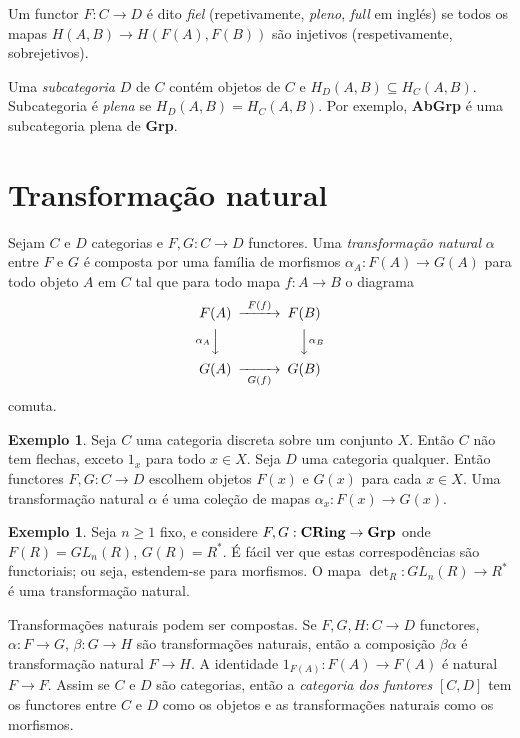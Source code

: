 \documentclass[12pt]{amsart}
\theoremstyle{definition}
\newtheorem{example}[theorem]{Exemplo}
\begin{document}
Um functor $F:C\to D$ é dito \emph{fiel} (repetivamente, \emph{pleno}, \emph{full} em inglés) se todos os mapas $H(A,B)\to H(F(A),F(B))$ são injetivos (respetivamente, sobrejetivos). 

Uma \emph{subcategoria} $D$ de $C$ contém objetos de $C$ e $H_D(A,B)\subseteq H_C(A,B)$. Subcategoria é 
\emph{plena}  se 
$H_D(A,B)= H_C(A,B)$. Por exemplo, {\bf AbGrp} é uma subcategoria plena de {\bf Grp}.

\section{Transformação natural}

Sejam $C$ e $D$ categorias e $F,G: C\to D$ functores. Uma \emph{transformação natural} $\alpha$ entre $F$ e $G$ é composta por uma família de morfismos 
$\alpha_A:F(A)\to G(A)$ para todo objeto $A$ em $C$ tal que para todo mapa $f:A \to B$ o diagrama 
\begin{equation}\label{eq:natural}
\begin{CD}
F(A) @>F(f)>> F(B)\\
 @V\alpha_AVV       @VV\alpha_BV\\
G(A) @>>G(f)> G(B)
\end{CD}
\end{equation}
comuta. 


\begin{example}
Seja $C$ uma categoria discreta sobre um conjunto $X$. Então $C$ não tem flechas, 
exceto $1_x$ para todo $x\in X$. Seja $D$ uma categoria qualquer. Então functores $F,G:C\to D$ escolhem 
objetos $F(x)$ e $G(x)$ para cada $x \in X$. Uma transformação natural $\alpha$ é uma coleção de mapas  $\alpha_x:F(x)\to G(x)$.   
\end{example}

\begin{example}
Seja $n\geq 1$ fixo, e considere $F,G:{\bf CRing} \to {\bf Grp}$ onde $F(R) = GL_n(R)$, $G(R)=R^*$. 
É fácil ver que estas correspodências são functoriais; ou seja, estendem-se para morfismos. O mapa 
$\det_R:GL_n(R) \to R^*$ é uma transformação natural. 
\end{example}

Transformações naturais podem ser compostas. Se $F,G,H:C\to D$ functores, $\alpha:F\to G$, $\beta:G\to H$ são transformações naturais, então a composição $\beta\alpha$ é transformação natural $F\to H$. A identidade $1_{F(A)}:F(A)\to F(A)$ é natural $F\to F$. Assim se $C$ e $D$ são categorias, então 
a \emph{categoria dos funtores} $[C,D]$ tem os functores entre $C$ e $D$ como os objetos e as 
transformações naturais como os morfismos. 
\end{document}
